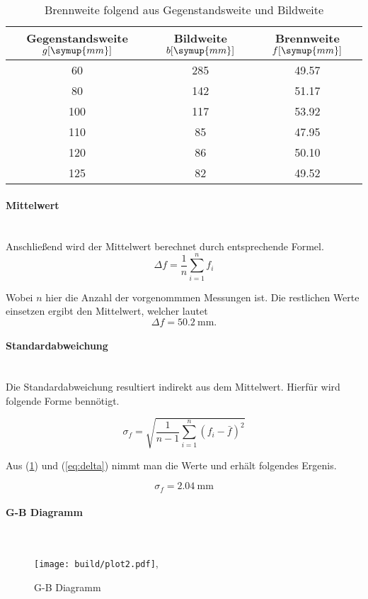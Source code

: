  \begin{table}
\centering
\begin{tabular}{c c c}
    Gegenstandsweite $g [\symup{mm}]$ & Bildweite $b [\symup{mm}]$ & Brennweite $f [\symup{mm}]$\\
    \midrule
    60 &285 &49.57\\
    80 &142 &51.17\\
    100& 117&53.92\\
    110& 85 &47.95\\
    120& 86 &50.10\\
    125& 82 &49.52\\
    \bottomrule
    
\end{tabular}
\caption{Brennweite folgend aus Gegenstandsweite und Bildweite}
\label{tab:loesung}
\end{table}

\paragraph{Mittelwert} \mbox{} \\
Anschließend wird der Mittelwert berechnet durch entsprechende Formel.
\begin{equation}
\Delta f = \frac{1}{n} \sum_{i=1}^n f_i 
\end{equation}

Wobei $n$ hier die Anzahl der vorgenommmen Messungen ist. Die restlichen Werte einsetzen ergibt den Mittelwert, welcher lautet
\begin{equation}
\label{eq:delta}
\Delta f=\SI{50.2}{\milli\meter}.
\end{equation}

\paragraph{Standardabweichung} \mbox{} \\
Die Standardabweichung resultiert indirekt aus dem Mittelwert. Hierfür wird folgende Forme bennötigt.

\begin{equation}
\sigma_f = \sqrt{\frac{1}{n-1} \sum_{i=1}^n (f_i - \bar{f})^2}
\end{equation}

Aus (\ref{tab:loesung}) und (\ref{eq:delta}) nimmt man die Werte und erhält folgendes Ergenis.

\begin{equation}
\sigma_f = \SI{2.04}{\milli\meter}
\end{equation}

\newpage
\paragraph{G-B Diagramm} \mbox{} \\

\begin{figure}
    \centering
    \texttt{[image: build/plot2.pdf]},
   \caption{G-B Diagramm}
   \label{fig:G-B}
\end{figure}